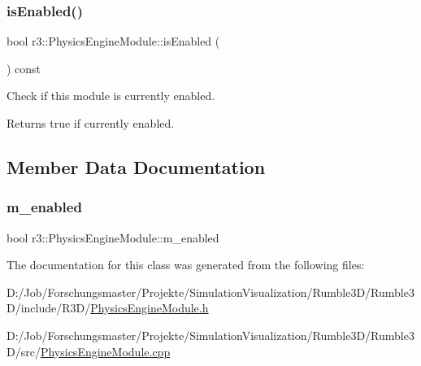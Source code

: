 \subsubsection{\texorpdfstring{is\+Enabled()}{isEnabled()}}
{\footnotesize\ttfamily bool r3\+::\+Physics\+Engine\+Module\+::is\+Enabled (\begin{DoxyParamCaption}{ }\end{DoxyParamCaption}) const}

Check if this module is currently enabled. \begin{DoxyReturn}{Returns}
true if currently enabled. 
\end{DoxyReturn}


\subsection{Member Data Documentation}
\mbox{\label{classr3_1_1_physics_engine_module_a9697a77e77dc5dd5990b16876ad413bf}} 
\subsubsection{\texorpdfstring{m\+\_\+enabled}{m\_enabled}}
{\footnotesize\ttfamily bool r3\+::\+Physics\+Engine\+Module\+::m\+\_\+enabled\hspace{0.3cm}{\ttfamily [protected]}}



The documentation for this class was generated from the following files\+:\begin{DoxyCompactItemize}
\item 
D\+:/\+Job/\+Forschungsmaster/\+Projekte/\+Simulation\+Visualization/\+Rumble3\+D/\+Rumble3\+D/include/\+R3\+D/\mbox{\hyperlink{_physics_engine_module_8h}{Physics\+Engine\+Module.\+h}}\item 
D\+:/\+Job/\+Forschungsmaster/\+Projekte/\+Simulation\+Visualization/\+Rumble3\+D/\+Rumble3\+D/src/\mbox{\hyperlink{_physics_engine_module_8cpp}{Physics\+Engine\+Module.\+cpp}}\end{DoxyCompactItemize}
